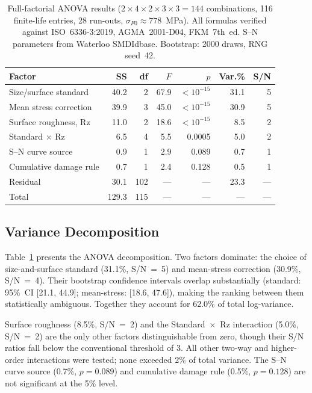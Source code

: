 \documentclass[12pt,a4paper]{article}
\begin{document}
\begin{table}[h]
\centering
\caption{Full-factorial ANOVA results ($2\times4\times2\times3\times3 =
144$ combinations, 116 finite-life entries, 28 run-outs,%
$\sigma_{F0}\approx778$~MPa). All formulas verified against
ISO~6336-3:2019, AGMA~2001-D04, FKM~7th~ed. S--N parameters from
Waterloo SMDIdbase. Bootstrap: 2000 draws, RNG seed~42.}
\label{tab:anova}
\begin{tabular}{lrrrrrr}
\toprule
Factor & SS & df & $F$ & $p$ & Var.\% & S/N \\
\midrule
Size/surface standard & 40.2 & 2 & 67.9 & $<10^{-15}$ & 31.1 & 5 \\
Mean stress correction & 39.9 & 3 & 45.0 & $<10^{-15}$ & 30.9 & 5 \\
Surface roughness, Rz & 11.0 & 2 & 18.6 & $<10^{-15}$ & 8.5 & 2 \\
Standard $\times$ Rz & 6.5 & 4 & 5.5 & 0.0005 & 5.0 & 2 \\
S--N curve source & 0.9 & 1 & 2.9 & 0.089 & 0.7 & 1 \\
Cumulative damage rule & 0.7 & 1 & 2.4 & 0.128 & 0.5 & 1 \\
\midrule
Residual & 30.1 & 102 & --- & --- & 23.3 & --- \\
Total & 129.3 & 115 & --- & --- & --- & --- \\
\bottomrule
\end{tabular}
\end{table}

\subsection{Variance Decomposition}

Table~\ref{tab:anova} presents the ANOVA decomposition. Two factors
dominate: the choice of size-and-surface standard (31.1\%, S/N~=~5)
and mean-stress correction (30.9\%, S/N~=~4). Their bootstrap
confidence intervals overlap substantially (standard: 95\%~CI
[21.1, 44.9]; mean-stress: [18.6, 47.6]), making the ranking between
them statistically ambiguous. Together they account for 62.0\% of
total log-variance.

Surface roughness (8.5\%, S/N~=~2) and the Standard~$\times$~Rz
interaction (5.0\%, S/N~=~2) are the only other factors distinguishable
from zero, though their S/N ratios fall below the conventional
threshold of 3. All other two-way and higher-order interactions
were tested; none exceeded 2\% of total variance. The S--N curve
source (0.7\%, $p=0.089$) and cumulative damage rule (0.5\%,
$p=0.128$) are not significant at the 5\% level.
\end{document}
